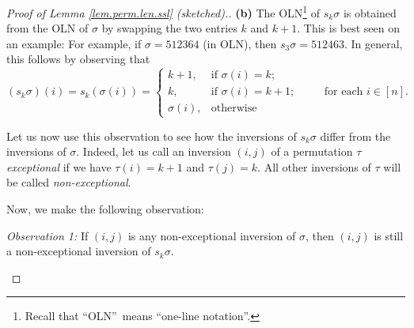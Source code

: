 \begin{proof}
[Proof of Lemma \ref{lem.perm.len.ssl} (sketched).]\textbf{(b)} The
OLN\footnote{Recall that \textquotedblleft OLN\textquotedblright\ means
\textquotedblleft one-line notation\textquotedblright.} of $s_{k}\sigma$ is
obtained from the OLN of $\sigma$ by swapping the two entries $k$ and $k+1$.
This is best seen on an example: For example, if $\sigma=512364$ (in OLN),
then $s_{3}\sigma=512463$. In general, this follows by observing that%
\[
\left(  s_{k}\sigma\right)  \left(  i\right)  =s_{k}\left(  \sigma\left(
i\right)  \right)  =%
\begin{cases}
k+1, & \text{if }\sigma\left(  i\right)  =k;\\
k, & \text{if }\sigma\left(  i\right)  =k+1;\\
\sigma\left(  i\right)  , & \text{otherwise}%
\end{cases}
\ \ \ \ \ \ \ \ \ \ \text{for each }i\in\left[  n\right]  .
\]


Let us now use this observation to see how the inversions of $s_{k}\sigma$
differ from the inversions of $\sigma$. Indeed, let us call an inversion
$\left(  i,j\right)  $ of a permutation $\tau$ \emph{exceptional} if we have
$\tau\left(  i\right)  =k+1$ and $\tau\left(  j\right)  =k$. All other
inversions of $\tau$ will be called \emph{non-exceptional}.

Now, we make the following observation:

\begin{statement}
\textit{Observation 1:} If $\left(  i,j\right)  $ is any non-exceptional
inversion of $\sigma$, then $\left(  i,j\right)  $ is still a non-exceptional
inversion of $s_{k}\sigma$.
\end{statement}


\end{proof}
